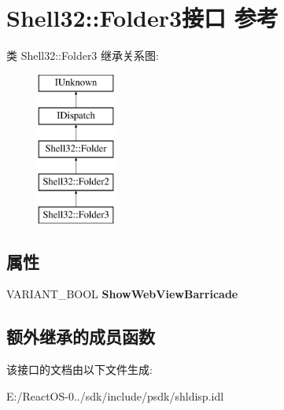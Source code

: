 \hypertarget{interface_shell32_1_1_folder3}{}\section{Shell32\+:\+:Folder3接口 参考}
\label{interface_shell32_1_1_folder3}
类 Shell32\+:\+:Folder3 继承关系图\+:\begin{figure}[H]
\begin{center}
\leavevmode
\includegraphics[height=5.000000cm]{interface_shell32_1_1_folder3}
\end{center}
\end{figure}
\subsection*{属性}
\begin{DoxyCompactItemize}
\item 
\mbox{\label{interface_shell32_1_1_folder3_af6f46ea4ad58a7e29edfde2e48fdc90d}} 
V\+A\+R\+I\+A\+N\+T\+\_\+\+B\+O\+OL {\bfseries Show\+Web\+View\+Barricade}
\end{DoxyCompactItemize}
\subsection*{额外继承的成员函数}


该接口的文档由以下文件生成\+:\begin{DoxyCompactItemize}
\item 
E\+:/\+React\+O\+S-\/0../sdk/include/psdk/shldisp.\+idl\end{DoxyCompactItemize}
